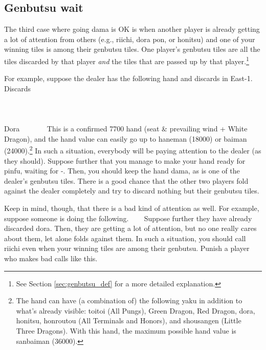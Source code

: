 \subsection{{\jap Genbutsu} wait}  \label{sec:genbutsu}
The third case where going {\jap dama} is OK is when another player is already getting a lot of attention from others (e.g., riichi, {\jap dora} {\jap pon}, or {\jap honitsu}) and one of your winning tiles is among their {\jap genbutsu} tiles.
One player's {\jap genbutsu} tiles are all the tiles discarded by that player \emph{and} the tiles that are passed up by that player.\footnote{See Section \ref{sec:genbutsu_def} for a more detailed explanation.}

\bigskip
For example, suppose the dealer has the following hand and discards in East-1. 
\bp
\vspace{-20pt}
{\small Discards}\\ \vspace{-10pt}
\xi{}\\
\vspace{-10pt}
\hspace{-35pt}\\
\vspace{-10pt}
\ep
\bp
{}
\rbai\bai\bai~~\dong\dong\rdong~~\\
\hfill\footnotesize{{\jap Dora}~~~~~~~}
\ep
This is a confirmed 7700 hand (seat \& prevailing wind + White Dragon), and the hand value can easily go up to {\jap haneman} (18000) or {\jap baiman} (24000).\footnote{The hand can have (a combination of) the following {\jap yaku} in addition to what's already visible: {\jap toitoi} (All Pungs), Green Dragon, Red Dragon, {\jap dora}, {\jap honitsu}, {\jap honroutou} (All Terminals and Honors), and {\jap shousangen} (Little Three Dragons). With this hand, the maximum possible hand value is {\jap sanbaiman} (36000).} 
In such a situation, everybody will be paying attention to the dealer (as they should). Suppose further that you manage to make your hand ready for {\jap pinfu}, waiting for {\LARGE{}-}. Then, you should keep the hand {\jap dama}, as {\LARGE{}} is one of the dealer's {\jap genbutsu} tiles. There is a good chance that the other two players fold against the dealer completely and try to discard nothing but their {\jap genbutsu} tiles. 

\bigskip

Keep in mind, though, that there is a bad kind of attention as well. For example, suppose someone is doing the following.
\bp
{} ~\zhong\zhong\rzhong~~
\ep
Suppose further they have already discarded {\jap dora}. Then, they are getting a lot of attention, but no one really cares about them, let alone folds against them. In such a situation, you should call riichi even when your winning tiles are among their {\jap genbutsu}. Punish a player who makes bad calls like this.


